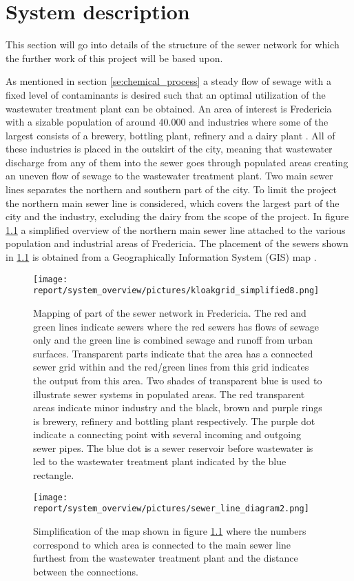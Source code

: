 \chapter{System description}\label{se:system_description}
This section will go into details of the structure of the sewer network for which the further work of this project will be based upon.

As mentioned in section \ref{se:chemical_process} a steady flow of sewage with a fixed level of contaminants is desired such that an optimal utilization of the wastewater treatment plant can be obtained. An area of interest is Fredericia with a sizable population of around 40.000 and industries where some of the largest consists of a brewery, bottling plant, refinery and a dairy plant \cite{Statistic_Denmark}. All of these industries is placed in the outskirt of the city, meaning that wastewater discharge from any of them into the sewer goes through populated areas creating an uneven flow of sewage to the wastewater treatment plant. Two main sewer lines separates the northern and southern part of the city. To limit the project the northern main sewer line is considered, which covers the largest part of the city and the industry, excluding the dairy from the scope of the project. In figure \ref{fig:kloakgrid_simplified} a simplified overview of the northern main sewer line attached to the various population and industrial areas of Fredericia. The placement of the sewers shown in \ref{fig:kloakgrid_simplified} is obtained from a Geographically Information System (GIS) map \cite{GIS_kort}.     

\begin{figure}[H]
\centering
\texttt{[image: report/system\_overview/pictures/kloakgrid\_simplified8.png]}
\caption{Mapping of part of the sewer network in Fredericia. The red and green lines indicate sewers where the red sewers has flows of sewage only and the green line is combined sewage and runoff from urban surfaces. Transparent parts indicate that the area has a connected sewer grid within and the red/green lines from this grid indicates the output from this area. Two shades of transparent blue is used to illustrate sewer systems in populated areas. The red transparent areas indicate minor industry and the black, brown and purple rings is brewery, refinery and bottling plant respectively. The purple dot indicate a connecting point with several incoming and outgoing sewer pipes. The blue dot is a sewer reservoir before wastewater is led to the wastewater treatment plant indicated by the blue rectangle.}
\label{fig:kloakgrid_simplified}
\end{figure}


\begin{figure}[H]
\centering
\texttt{[image: report/system\_overview/pictures/sewer\_line\_diagram2.png]}
\caption{Simplification of the map shown in figure \ref{fig:kloakgrid_simplified} where the numbers correspond to which area is connected to the main sewer line furthest from the wastewater treatment plant and the distance between the connections.}
\label{fig:sewer_line_diagram}
\end{figure}